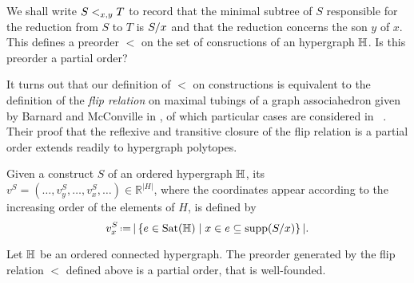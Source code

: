 We shall write $S <_{x,y} T$ to record that the  minimal  subtree of $S$ responsible for the reduction from $S$ to $T$ is $S/x$ and that the reduction concerns the son $y$ of $x$.
This defines a preorder $<$ on the set of consructions of an hypergraph ${\mathbb H}$.
Is this preorder a partial order? 

It turns out that our definition of $<$ on constructions is equivalent to the definition of the \emph{flip relation} on maximal tubings of a graph associahedron given by Barnard and McConville in \cite{Barnard-McConville}, of which particular cases are considered in ~\cite{Forcey-Tamari}.
Their proof that the reflexive and transitive closure of the flip relation is a partial order extends readily to hypergraph polytopes.

\begin{definition}
  \label{def:coordinate-vector}
  Given a construct $S$ of an ordered hypergraph ${\mathbb H}$, its 
  $v^S=(\ldots,v^S_y,\ldots,v^S_x,\ldots) \in \mathbb{R}^{|H|}$, where the coordinates appear according to the increasing order of the elements of $H$, is defined by
  $$v^S_x\eqdef |\setc{e\in{\Sat}(\hyper{H})}{x\in e\inc \supp(\occ{S}{x})}|.$$
\end{definition}


\begin{proposition} 
\label{p:flip-partial-order}
Let ${\mathbb H}$ be an ordered connected hypergraph. 
The preorder generated by the flip relation $<$ defined above is a partial order, that is well-founded.
\end{proposition}


